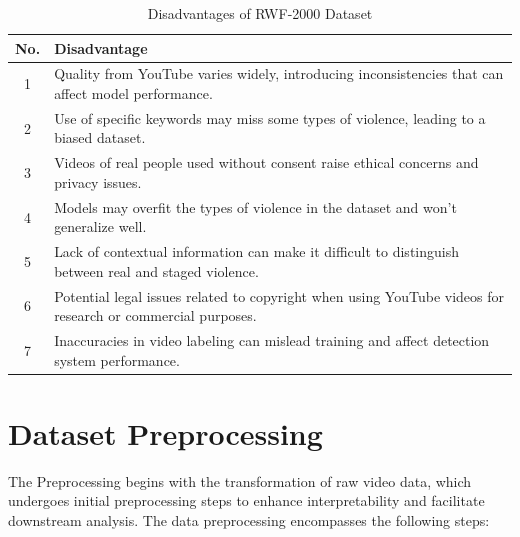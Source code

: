 \vspace{-5mm}

\begin{table}[h!]
\centering
\caption{Disadvantages of RWF-2000 Dataset}
\begin{tabular}{|c|p{12cm}|}
\hline
\textbf{No.} & \textbf{Disadvantage}                                                                                          \\ \hline
1            & Quality from YouTube varies widely, introducing inconsistencies that can affect model performance.              \\ \hline
2            & Use of specific keywords may miss some types of violence, leading to a biased dataset.                          \\ \hline
3            & Videos of real people used without consent raise ethical concerns and privacy issues.                           \\ \hline
4            & Models may overfit the types of violence in the dataset and won't generalize well.                             \\ \hline
5            & Lack of contextual information can make it difficult to distinguish between real and staged violence.           \\ \hline
6            & Potential legal issues related to copyright when using YouTube videos for research or commercial purposes.      \\ \hline
7            & Inaccuracies in video labeling can mislead training and affect detection system performance.                    \\ \hline
\end{tabular}
\label{rwf2000disadv}
\end{table}




\clearpage

\section{Dataset Preprocessing}

The Preprocessing begins with the transformation of raw video data, which undergoes initial preprocessing steps to enhance interpretability and facilitate downstream analysis. The data preprocessing encompasses the following steps:

